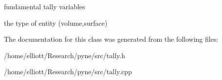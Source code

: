 fundamental tally variables 

the type of entity (volume,surface) 

The documentation for this class was generated from the following files\-:\begin{DoxyCompactItemize}
\item 
/home/elliott/\-Research/pyne/src/tally.\-h\item 
/home/elliott/\-Research/pyne/src/tally.\-cpp\end{DoxyCompactItemize}
